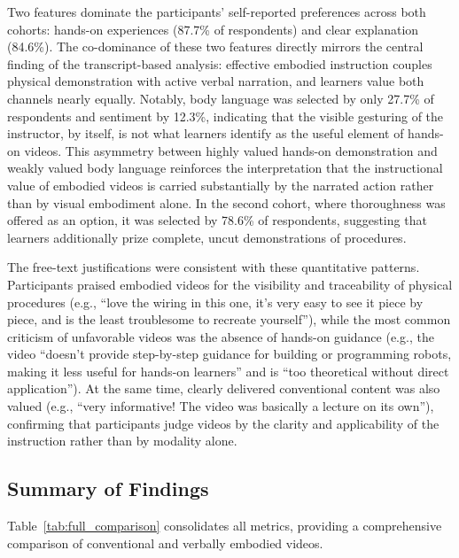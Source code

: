 Two features dominate the participants' self-reported preferences across both cohorts: hands-on experiences (87.7\% of respondents) and clear explanation (84.6\%). The co-dominance of these two features directly mirrors the central finding of the transcript-based analysis: effective embodied instruction couples physical demonstration with active verbal narration, and learners value both channels nearly equally. Notably, body language was selected by only 27.7\% of respondents and sentiment by 12.3\%, indicating that the visible gesturing of the instructor, by itself, is not what learners identify as the useful element of hands-on videos. This asymmetry between highly valued hands-on demonstration and weakly valued body language reinforces the interpretation that the instructional value of embodied videos is carried substantially by the narrated action rather than by visual embodiment alone. In the second cohort, where thoroughness was offered as an option, it was selected by 78.6\% of respondents, suggesting that learners additionally prize complete, uncut demonstrations of procedures.

The free-text justifications were consistent with these quantitative patterns. Participants praised embodied videos for the visibility and traceability of physical procedures (e.g., ``love the wiring in this one, it's very easy to see it piece by piece, and is the least troublesome to recreate yourself''), while the most common criticism of unfavorable videos was the absence of hands-on guidance (e.g., the video ``doesn't provide step-by-step guidance for building or programming robots, making it less useful for hands-on learners'' and is ``too theoretical without direct application''). At the same time, clearly delivered conventional content was also valued (e.g., ``very informative! The video was basically a lecture on its own''), confirming that participants judge videos by the clarity and applicability of the instruction rather than by modality alone.

\subsection{Summary of Findings}

Table~\ref{tab:full_comparison} consolidates all metrics, providing a comprehensive comparison of conventional and verbally embodied videos.

